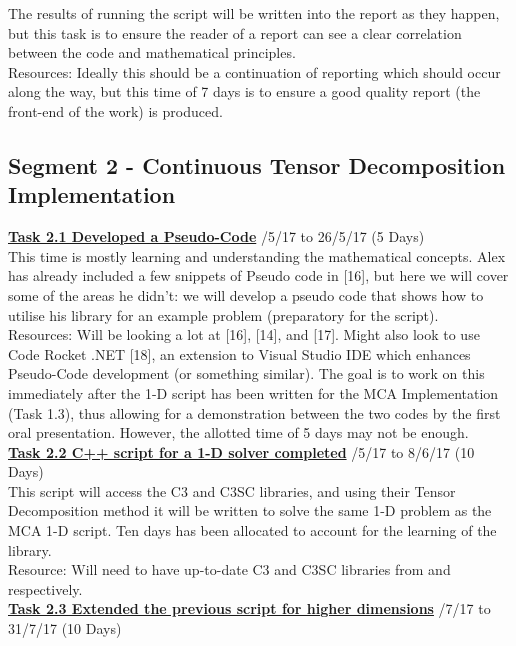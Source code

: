 \documentclass[11pt,draftd]{article}
\begin{document}
\begin{appendices}
	\noindent The results of running the script will be written into the report as they happen, but this task is to ensure the reader of a report can see a clear correlation between the code and mathematical principles. \\
	Resources: Ideally this should be a continuation of reporting which should occur along the way, but this time of 7 days is to ensure a good quality report (the front-end of the work) is produced.
	
	\subsection{Segment 2 - Continuous Tensor Decomposition Implementation}
	\underline{\textbf{Task 2.1 Developed a Pseudo-Code}} /5/17 to 26/5/17 (5 Days) \\
	
	\noindent This time is mostly learning and understanding the mathematical concepts.
	Alex has already included a few snippets of Pseudo code in [16], but here we will cover some of the areas he didn’t: we will develop a pseudo code that shows how to utilise his library for an example problem (preparatory for the script). \\
	Resources: Will be looking a lot at [16], [14], and [17]. Might also look to use Code Rocket .NET [18], an extension to Visual Studio IDE which enhances Pseudo-Code development (or something similar). The goal is to work on this immediately after the 1-D script has been written for the MCA Implementation (Task 1.3), thus allowing for a demonstration between the two codes by the first oral presentation. However, the allotted time of 5 days may not be enough.\\
	
	\noindent\underline{\textbf{Task 2.2 C++ script for a 1-D solver completed}} /5/17 to 8/6/17 (10 Days) \\
	
	\noindent This script will access the C3 and C3SC libraries, and using their Tensor Decomposition method it will be written to solve the same 1-D problem as the MCA 1-D script. Ten days has been allocated to account for the learning of the library. \\
	Resource: Will need to have up-to-date C3 and C3SC libraries from \cite{c3c} and \cite{c3cs} respectively.\\
	
	\noindent\underline{\textbf{Task 2.3 Extended the previous script for higher dimensions}} /7/17 to 31/7/17 (10 Days) \\
	

\end{appendices}
\end{document}
